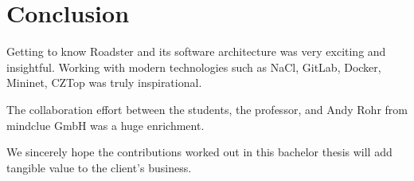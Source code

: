 \chapter{Conclusion}






Getting to know Roadster and its software architecture was very exciting and insightful.
Working with modern technologies such as NaCl, GitLab, Docker, Mininet, CZTop was truly inspirational.

The collaboration effort between the students, the professor, and Andy Rohr
from mindclue GmbH was a huge enrichment.

We sincerely hope the contributions worked out in this bachelor thesis will add
tangible value to the client's business.
